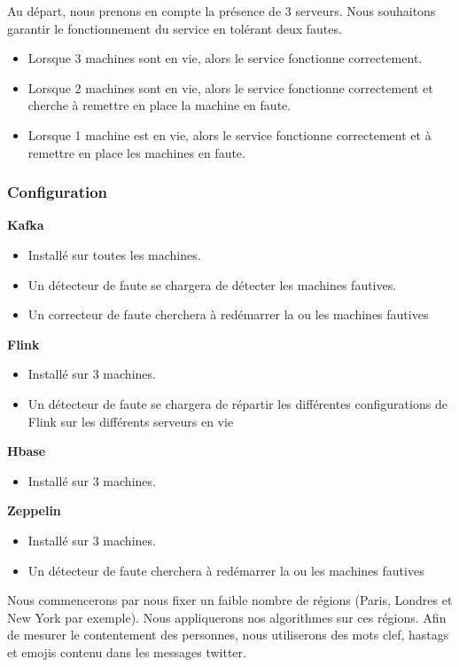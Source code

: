 \documentclass[a4paper,oneside,10pt]{article}
\begin{document}
Au départ, nous prenons en compte la présence de 3 serveurs. 
Nous souhaitons garantir le fonctionnement du service en tolérant deux fautes. 

\begin{itemize}
	\item Lorsque 3 machines sont en vie, alors le service fonctionne correctement.
	\item Lorsque 2 machines sont en vie, alors le service fonctionne correctement et cherche à remettre en place la machine en faute.
	\item Lorsque 1 machine est en vie, alors le service fonctionne correctement et à remettre en place les machines en faute. 
\end{itemize}

\subsubsection{Configuration}

\textbf{Kafka}
\begin{itemize}
	\item Installé sur toutes les machines. 
	\item Un détecteur de faute se chargera de détecter les machines fautives.
	\item Un correcteur de faute cherchera à redémarrer la ou les machines fautives
\end{itemize}

\textbf{Flink}
\begin{itemize}
	\item Installé sur 3 machines. 
	\item Un détecteur de faute se chargera de répartir les différentes configurations de Flink sur les différents serveurs en vie
\end{itemize}

\textbf{Hbase}
\begin{itemize}
	\item Installé sur 3 machines. 
\end{itemize}
	
\textbf{Zeppelin}
\begin{itemize}
	\item Installé sur 3 machines. 
	\item Un détecteur de faute cherchera à redémarrer la ou les machines fautives 
\end{itemize}

Nous commencerons par nous fixer un faible nombre de régions (Paris, Londres et New York par exemple). Nous appliquerons nos algorithmes sur ces régions. 
Afin de mesurer le contentement des personnes, nous utiliserons des mots clef, hastags et emojis contenu dans les messages twitter. 
\end{document}
